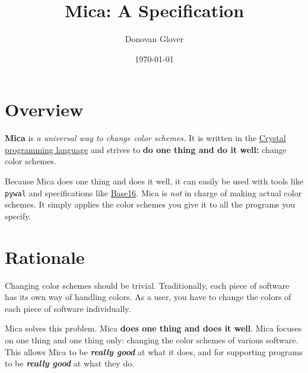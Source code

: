 \documentclass{article}
\title{Mica: A Specification}
\author{Donovan Glover}
\date{\today}
\theoremstyle{definition}
\begin{document}

    \maketitle
    \tableofcontents

    \newpage


    \section{Overview}

    \textbf{Mica} is \emph{a universal way to change color schemes.} It is written in the \href{https://crystal-lang.org}{Crystal programming language} and strives to \textbf{do one thing and do it well:} change color schemes.

    Because Mica does one thing and does it well, it can easily be used with tools like \texttt{pywal} and specifications like \href{https://github.com/chriskempson/base16}{Base16}. Mica is \emph{not} in charge of making actual color schemes. It simply applies the color schemes you give it to all the programs you specify.

    \newpage


    \section{Rationale}

    Changing color schemes should be trivial. Traditionally, each piece of software has its own way of handling colors. As a user, you have to change the colors of each piece of software individually.

    Mica solves this problem. Mica \textbf{does one thing and does it well}. Mica focuses on one thing and one thing only: changing the color schemes of various software. This allows Mica to be \emph{\textbf{really good}} at what it does, and for supporting programs to be \emph{\textbf{really good}} at what they do.

    \newpage

\end{document}
